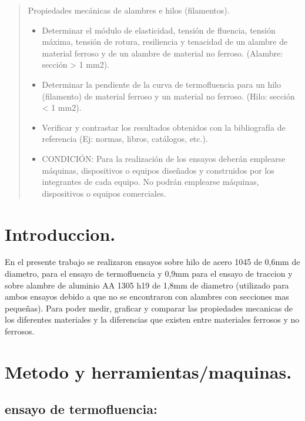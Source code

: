 \documentclass[12pt,a4paper]{article}
\begin{document}

\newpage
\tableofcontents

\begin{abstract}
    Propiedades mecánicas de alambres e hilos (filamentos).
    \begin{itemize}
        \item Determinar el módulo de elasticidad, tensión de fluencia, tensión máxima, tensión de rotura, resiliencia y tenacidad de un alambre de material ferroso y de un alambre de material no ferroso. (Alambre: sección > 1 mm2).
        \item Determinar la pendiente de la curva de termofluencia para un hilo (filamento) de material ferroso y un material no ferroso. (Hilo: sección < 1 mm2).
        \item Verificar y contrastar los resultados obtenidos con la bibliografía de referencia (Ej: normas, libros, catálogos, etc.).
        \item CONDICIÓN: Para la realización de los ensayos deberán emplearse máquinas, dispositivos o equipos diseñados y construidos por los integrantes de cada equipo. No podrán emplearse máquinas, dispositivos o equipos comerciales.
    \end{itemize}
\end{abstract}

\section{Introduccion.}

En el presente trabajo se realizaron ensayos sobre hilo de acero 1045 de 0,6mm de diametro, para el ensayo de termofluencia y 0,9mm para el ensayo de traccion y sobre alambre de aluminio AA 1305 h19 de 1,8mm de diametro (utilizado para ambos ensayos debido a que no se encontraron con alambres con secciones mas pequeñas). 
Para poder medir, graficar y comparar las propiedades mecanicas de los diferentes materiales y la diferencias que existen entre materiales ferrosos y no ferrosos.


\section{Metodo y herramientas/maquinas.}

\subsection{ensayo de termofluencia:}
\end{document}
